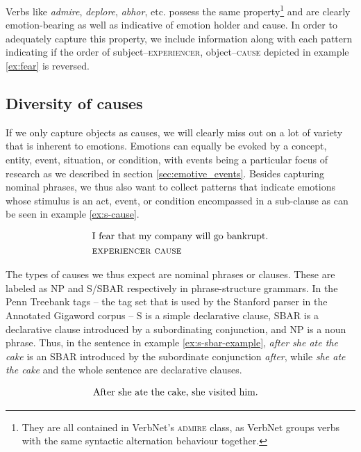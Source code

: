 Verbs like \textit{admire}, \textit{deplore}, \textit{abhor}, etc. possess the same property\footnote{They are all contained in VerbNet's \textsc{admire} class, as VerbNet groups verbs with the same syntactic alternation behaviour together.} and are clearly emotion-bearing as well as indicative of emotion holder and cause. In order to adequately capture this property, we include information along with each pattern indicating if the order of subject--\textsc{experiencer}, object--\textsc{cause} depicted in example \ref{ex:fear} is reversed.

\subsection{Diversity of causes}

If we only capture objects as causes, we will clearly miss out on a lot of variety that is inherent to emotions. Emotions can equally be evoked by a concept, entity, event, situation, or condition, with events being a particular focus of research as we described in section \ref{sec:emotive_events}. Besides capturing nominal phrases, we thus also want to collect patterns that indicate emotions whose stimulus is an act, event, or condition encompassed in a sub-clause as can be seen in example \ref{ex:s-cause}.

\begin{align}
\begin{split}\label{ex:s-cause}
&\textnormal{I fear that my company will go bankrupt.}\\
&\textnormal{\textsc{experiencer}	\textsc{cause}}
\end{split}
\end{align}

The types of causes we thus expect are nominal phrases or clauses. These are labeled as NP and S/SBAR respectively in phrase-structure grammars. In the Penn Treebank tags -- the tag set that is used by the Stanford parser in the Annotated Gigaword corpus -- S is a simple declarative clause, SBAR is a declarative clause introduced by a subordinating conjunction, and NP is a noun phrase. Thus, in the sentence in example \ref{ex:s-sbar-example}, \textit{after she ate the cake} is an SBAR introduced by the subordinate conjunction \textit{after}, while \textit{she ate the cake} and the whole sentence are declarative clauses.

\begin{align}
\begin{split}\label{ex:s-sbar-example}
&\textnormal{After she ate the cake, she visited him.}
\end{split}
\end{align}


